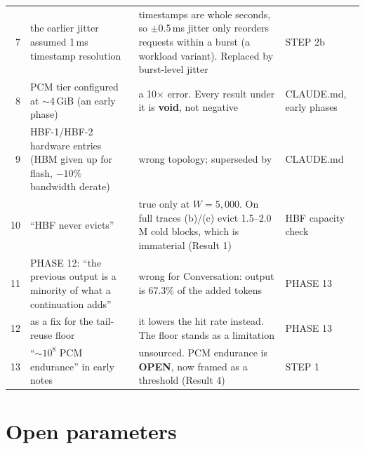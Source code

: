 \documentclass[11pt,a4paper]{article}
\newcommand{\OPEN}{\textbf{OPEN}}
\begin{document}
\begin{xltabular}{\linewidth}{@{}r Y{0.95} Y{1.05} P{22mm}@{}}
7 & the earlier jitter assumed 1\,ms timestamp resolution
  & timestamps are whole seconds, so $\pm$0.5\,ms jitter only reorders requests within a burst (a workload variant). Replaced by burst-level jitter
  & STEP 2b \\
8 & PCM tier configured at $\sim$4\,GiB (an early phase)
  & a 10$\times$ error. Every  result under it is \textbf{void}, not negative
  & CLAUDE.md, early phases \\
9 & HBF-1/HBF-2 hardware entries (HBM given up for flash, $-10$\% bandwidth derate)
  & wrong topology; superseded by 
  & CLAUDE.md \\
10 & ``HBF never evicts''
  & true only at $W = 5{,}000$. On full traces (b)/(c) evict 1.5--2.0\,M cold blocks, which is immaterial (Result 1)
  & HBF capacity check \\
11 & PHASE 12: ``the previous output is a minority of what a continuation adds''
  & wrong for Conversation: output is 67.3\% of the added tokens
  & PHASE 13 \\
12 &  as a fix for the tail-reuse floor
  & it lowers the hit rate instead. The floor stands as a limitation
  & PHASE 13 \\
13 & ``$\sim 10^{8}$ PCM endurance'' in early notes
  & unsourced. PCM endurance is \OPEN, now framed as a threshold (Result 4)
  & STEP 1 \\
\end{xltabular}

\section{Open parameters}\label{sec:open}
\end{document}
